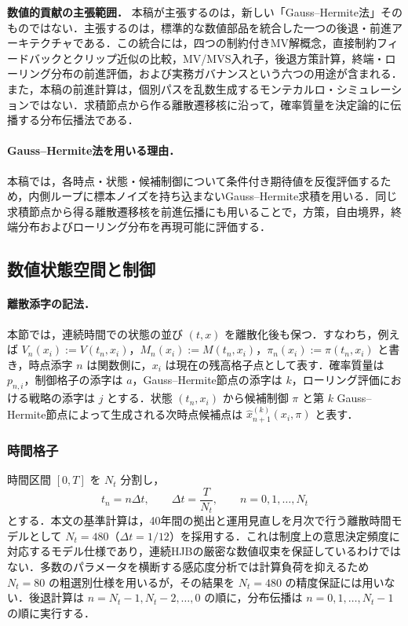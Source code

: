 \documentclass[10pt,a4paper]{article}
\theoremstyle{plain}
\theoremstyle{definition}
\begin{document}
\noindent\textbf{数値的貢献の主張範囲．}
本稿が主張するのは，新しい「Gauss--Hermite法」そのものではない．主張するのは，標準的な数値部品を統合した一つの後退・前進アーキテクチャである．この統合には，四つの制約付きMV解概念，直接制約フィードバックとクリップ近似の比較，MV/MVS入れ子，後退方策計算，終端・ローリング分布の前進評価，および実務ガバナンスという六つの用途が含まれる．また，本稿の前進計算は，個別パスを乱数生成するモンテカルロ・シミュレーションではない．求積節点から作る離散遷移核に沿って，確率質量を決定論的に伝播する分布伝播法である．

\paragraph{Gauss--Hermite法を用いる理由．}
本稿では，各時点・状態・候補制御について条件付き期待値を反復評価するため，内側ループに標本ノイズを持ち込まないGauss--Hermite求積を用いる．同じ求積節点から得る離散遷移核を前進伝播にも用いることで，方策，自由境界，終端分布およびローリング分布を再現可能に評価する．

\subsection{数値状態空間と制御}
\label{sec:grid}

\paragraph{離散添字の記法．}
本節では，連続時間での状態の並び $(t,x)$ を離散化後も保つ．すなわち，例えば $V_n(x_i):=V(t_n,x_i)$，$M_n(x_i):=M(t_n,x_i)$，$\pi_n(x_i):=\pi(t_n,x_i)$ と書き，時点添字 $n$ は関数側に，$x_i$ は現在の残高格子点として表す．確率質量は $p_{n,i}$，制御格子の添字は $a$，Gauss--Hermite節点の添字は $k$，ローリング評価における戦略の添字は $j$ とする．状態 $(t_n,x_i)$ から候補制御 $\pi$ と第 $k$ Gauss--Hermite節点によって生成される次時点候補点は $\widehat{x}_{n+1}^{(k)}(x_i,\pi)$ と表す．

\subsubsection{時間格子}

時間区間 $[0,T]$ を $N_t$ 分割し，
\begin{equation}
  t_n=n\Delta t,
  \qquad
  \Delta t=\frac{T}{N_t},
  \qquad n=0,1,\ldots,N_t
  \label{eq:time-grid}
\end{equation}
とする．本文の基準計算は，40年間の拠出と運用見直しを月次で行う離散時間モデルとして $N_t=480$（$\Delta t=1/12$）を採用する．これは制度上の意思決定頻度に対応するモデル仕様であり，連続HJBの厳密な数値収束を保証しているわけではない．多数のパラメータを横断する感応度分析では計算負荷を抑えるため $N_t=80$ の粗選別仕様を用いるが，その結果を $N_t=480$ の精度保証には用いない．後退計算は $n=N_t-1,N_t-2,\ldots,0$ の順に，分布伝播は $n=0,1,\ldots,N_t-1$ の順に実行する．
\end{document}

